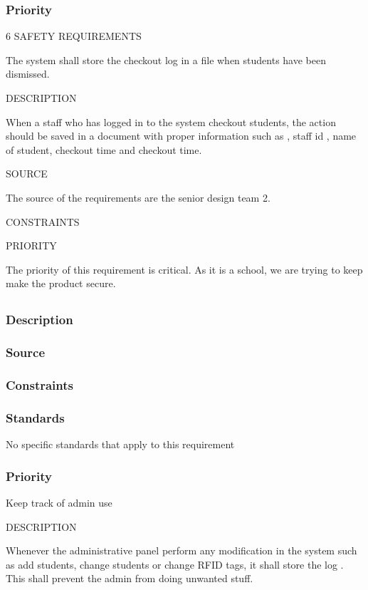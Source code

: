 \subsubsection{Priority}


6 SAFETY REQUIREMENTS

The system shall store the checkout log in a file when students have been dismissed.

DESCRIPTION

When a staff who has logged in to the system checkout students, the action should be saved in a document with proper information such as , staff id , name of student, checkout time and checkout time.

SOURCE

The source of the requirements are the senior design team 2.

CONSTRAINTS


PRIORITY

The priority of this requirement is critical. As it is a school, we are trying to keep make the product secure.



\subsection{}
\subsubsection{Description}

\subsubsection{Source}

\subsubsection{Constraints}

\subsubsection{Standards}
No specific standards that apply to this requirement
\subsubsection{Priority}


Keep track of admin use

DESCRIPTION

Whenever the administrative panel perform any modification in the system such as add students, change students or change RFID tags, it shall store the log . This shall prevent the admin from doing unwanted stuff.

